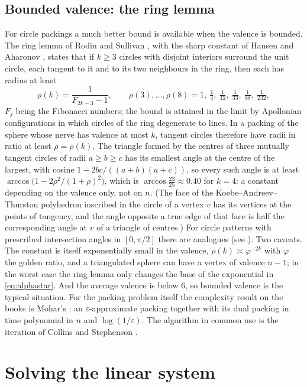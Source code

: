 \documentclass[11pt]{amsart}
\theoremstyle{definition}
\theoremstyle{remark}
\newcommand{\eps}{\varepsilon}
\begin{document}
\subsection{Bounded valence: the ring lemma}
For circle packings a much better bound is available when the valence is bounded. The ring lemma of Rodin and Sullivan \cite{RS87}, with the sharp constant of Hansen and Aharonov \cite{Han88,Aha97}, states that if $k\ge3$ circles with disjoint interiors surround the unit circle, each tangent to it and to its two neighbours in the ring, then each has radius at least
\[
\rho(k)=\frac1{F_{2k-3}-1},\qquad\rho(3),\dots,\rho(8)=1,\ \tfrac14,\ \tfrac1{12},\ \tfrac1{33},\ \tfrac1{88},\ \tfrac1{232},
\]
$F_j$ being the Fibonacci numbers; the bound is attained in the limit by Apollonian configurations in which circles of the ring degenerate to lines. In a packing of the sphere whose nerve has valence at most $k$, tangent circles therefore have radii in ratio at least $\rho=\rho(k)$. The triangle formed by the centres of three
mutually tangent circles of radii $a\ge b\ge c$ has its smallest angle at the centre of the largest, with cosine $1-2bc/((a+b)(a+c))$, so every such angle is at least
$\arccos\bigl(1-2\rho^2/(1+\rho)^2\bigr)$, which is $\arccos\frac{23}{25}\approx0.40$ for $k=4$: a constant depending on the valence only, not on $n$. (The face of the Koebe--Andreev--Thurston polyhedron inscribed in the circle of a vertex $v$ has its vertices at the points of tangency, and the angle opposite a true edge of that face is half the corresponding angle at $v$ of a triangle of centres.) For circle patterns with prescribed intersection angles in $[0,\pi/2]$ there are analogues (see \cite{He99}).
Two caveats. The constant is itself exponentially small in the valence, $\rho(k)\asymp\varphi^{-2k}$ with $\varphi$ the golden ratio, and a triangulated sphere can have a vertex of valence $n-1$; in the worst case the ring lemma only changes the base of the exponential in \eqref{eq:alphastar}. And the average valence is below $6$, so bounded valence is the typical situation.
For the packing problem itself the complexity result on the books is Mohar's \cite{Moh93}: an $\eps$-approximate packing together with its dual packing in time polynomial in $n$ and $\log(1/\eps)$. The algorithm in common use is the iteration of Collins and Stephenson \cite{CS03}.

\section{Solving the linear system}\label{sec:solve}
\end{document}
